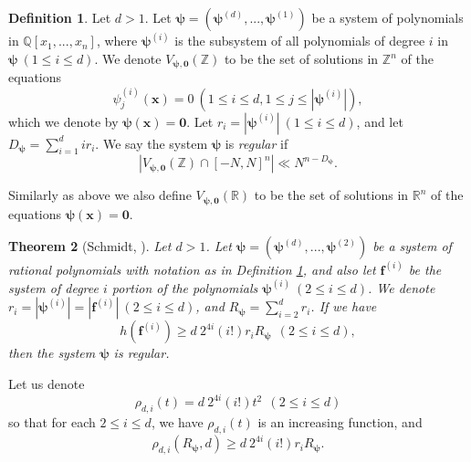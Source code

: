 \documentclass[12pt]{amsart}
\newtheorem{thm}{Theorem}[section]
\theoremstyle{definition}
\newtheorem{defn}[thm]{Definition}
\theoremstyle{remark}
\numberwithin{equation}{section}
\begin{document}
\begin{defn}
\label{def regular}
Let $d>1$. Let $\boldsymbol{\psi} = (\boldsymbol{\psi}^{(d)}, ..., \boldsymbol{\psi}^{(1)})$ be a system of polynomials in $\mathbb{Q}[x_1, ..., x_n]$,
where $\boldsymbol{\psi}^{(i)}$ is the subsystem of all polynomials of degree $i$ in
$\boldsymbol{\psi} \  (1 \leq i \leq d)$.
We denote $V_{\boldsymbol{\psi}, \mathbf{0}} (\mathbb{Z})$ to be the set of solutions in $\mathbb{Z}^n$ of the equations
$$
\psi^{(i)}_j (\mathbf{x}) = 0 \ (1 \leq i \leq d, 1 \leq j \leq | \boldsymbol{\psi}^{(i)} |),
$$
which we denote by
$\boldsymbol{\psi}(\mathbf{x}) = \mathbf{0}$.
Let $r_i = | \boldsymbol{\psi}^{(i)} | \ (1 \leq i \leq d)$,
and let $D_{\boldsymbol{\psi}} = \sum_{i=1}^d i r_i$. We say the system $\boldsymbol{\psi}$ is \textit{regular} if
$$
| V_{\boldsymbol{\psi}, \mathbf{0}} (\mathbb{Z}) \cap [-N,N]^n | \ll N^{n-D_{\boldsymbol{\psi} }  }.
$$
\end{defn}
Similarly as above we also define $V_{\boldsymbol{\psi}, \mathbf{0}} (\mathbb{R})$ to be the set of solutions in $\mathbb{R}^n$
of the equations $\boldsymbol{\psi}(\mathbf{x}) = \mathbf{0}$.
\begin{thm}[Schmidt, \cite{S}]
\label{Schmidt main}
Let $d>1$. Let $\boldsymbol{\psi} = (\boldsymbol{\psi}^{(d)}, ..., \boldsymbol{\psi}^{(2)})$ be a system of rational polynomials
with notation as in Definition \ref{def regular},
and also let $\mathbf{f}^{(i)}$ be the system of degree $i$ portion of the polynomials $\boldsymbol{\psi}^{(i)} \ (2 \leq i \leq d)$.
We denote $r_i = | \boldsymbol{\psi}^{(i)} | = | \mathbf{f}^{(i)} | \ (2 \leq i \leq d)$, and $R_{\boldsymbol{\psi} }  = \sum_{i=2}^d r_i$.
If we have
$$
h(  \mathbf{f}^{(i)} )  
\geq d \ 2^{4 i}  (i!)  r_i R_{\boldsymbol{\psi} }  \ \ (2 \leq i \leq d),
$$
then the system $\boldsymbol{\psi}$ is regular.
\end{thm}
Let us denote
\begin{equation}
\label{def rho}
\rho_{d,i}(t) =  d \ 2^{4 i}  (i!)  t^2  \ \ (2 \leq i \leq d)
\end{equation}
so that for each $2 \leq i \leq d$, we have $\rho_{d,i}(t)$ is an increasing function, and
$$
\rho_{d,i}(R_{\boldsymbol{\psi} }  ,d) \geq d \ 2^{4 i}  (i!)  r_i R_{\boldsymbol{\psi} } .
$$
\end{document}
